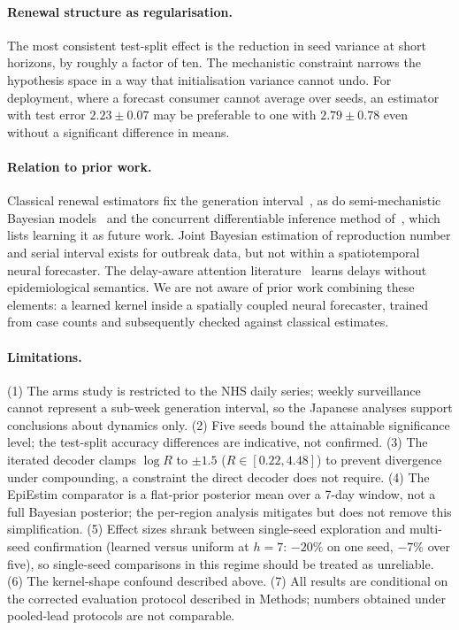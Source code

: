 \documentclass[10pt,letterpaper]{article}
\begin{document}
\paragraph{Renewal structure as regularisation.} The most consistent
test-split effect is the reduction in seed variance at short horizons, by
roughly a factor of ten. The mechanistic constraint narrows the hypothesis
space in a way that initialisation variance cannot undo. For deployment,
where a forecast consumer cannot average over seeds, an estimator with test
error $2.23\pm0.07$ may be preferable to one with $2.79\pm0.78$ even without
a significant difference in means.

\paragraph{Relation to prior work.} Classical renewal estimators fix the
generation interval~\cite{cori2013new,fraser2007estimating,
abbott2020estimating}, as do semi-mechanistic Bayesian
models~\cite{flaxman2020estimating} and the concurrent differentiable
inference method of~\cite{cirl2026conditional}, which lists learning it as
future work. Joint Bayesian estimation of reproduction number and serial
interval exists for outbreak data, but not within a spatiotemporal neural
forecaster. The delay-aware attention
literature~\cite{jiang2023pdformer,press2022train} learns delays without
epidemiological semantics. We are not aware of prior work combining these
elements: a learned kernel inside a spatially coupled neural forecaster,
trained from case counts and subsequently checked against classical
estimates.

\paragraph{Limitations.} (1) The arms study is restricted to the NHS daily
series; weekly surveillance cannot represent a sub-week generation interval,
so the Japanese analyses support conclusions about dynamics only. (2) Five
seeds bound the attainable significance level; the test-split accuracy
differences are indicative, not confirmed. (3) The iterated decoder clamps
$\log R$ to $\pm1.5$ ($R\in[0.22,4.48]$) to prevent divergence under
compounding, a constraint the direct decoder does not require. (4) The
EpiEstim comparator is a flat-prior posterior mean over a 7-day window, not a
full Bayesian posterior; the per-region analysis mitigates but does not
remove this simplification. (5) Effect sizes shrank between single-seed
exploration and multi-seed confirmation (learned versus uniform at $h=7$:
$-20\%$ on one seed, $-7\%$ over five), so single-seed comparisons in this
regime should be treated as unreliable. (6) The kernel-shape confound
described above. (7) All results are conditional on the corrected evaluation
protocol described in Methods; numbers obtained under pooled-lead protocols
are not comparable.
\end{document}
